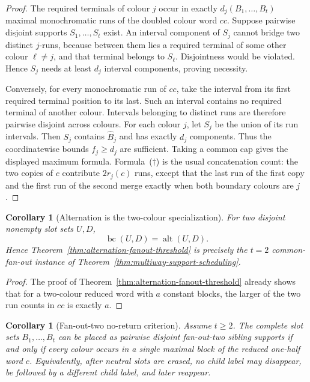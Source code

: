 \documentclass[11pt]{article}
\newtheorem{corollary}[definition]{Corollary}
\begin{document}
\begin{proof}
The required terminals of colour $j$ occur in exactly
$d_j(B_1,\ldots,B_t)$ maximal monochromatic runs of the doubled colour word
$cc$.  Suppose pairwise disjoint supports $S_1,\ldots,S_t$ exist.  An interval
component of $S_j$ cannot bridge two distinct $j$-runs, because between them
lies a required terminal of some other colour $\ell\ne j$, and that terminal
belongs to $S_\ell$.  Disjointness would be violated.  Hence $S_j$ needs at
least $d_j$ interval components, proving necessity.

Conversely, for every monochromatic run of $cc$, take the interval from its
first required terminal position to its last.  Such an interval contains no
required terminal of another colour.  Intervals belonging to distinct runs are
therefore pairwise disjoint across colours.  For each colour $j$, let $S_j$ be
the union of its run intervals.  Then $S_j$ contains $\widehat B_j$ and has
exactly $d_j$ components.  Thus the coordinatewise bounds $f_j\ge d_j$ are
sufficient.  Taking a common cap gives the displayed maximum formula.
Formula~\textup{($\dagger$)} is the usual concatenation count: the two copies of
$c$ contribute $2r_j(c)$ runs, except that the last run of the first copy and
the first run of the second merge exactly when both boundary colours are $j$.
\end{proof}

\begin{corollary}[Alternation is the two-colour specialization]
\label{cor:alternation-is-two-colour}
For two disjoint nonempty slot sets $U,D$,
\[
 \operatorname{bc}(U,D)=\operatorname{alt}(U,D).
\]
Hence Theorem~\ref{thm:alternation-fanout-threshold} is precisely the
$t=2$ common-fan-out instance of
Theorem~\ref{thm:multiway-support-scheduling}.
\end{corollary}

\begin{proof}
The proof of Theorem~\ref{thm:alternation-fanout-threshold} already shows that
for a two-colour reduced word with $a$ constant blocks, the larger of the two
run counts in $cc$ is exactly $a$.
\end{proof}

\begin{corollary}[Fan-out-two no-return criterion]
\label{cor:fanout-two-no-return}
Assume $t\ge2$.  The complete slot sets $B_1,\ldots,B_t$ can be placed as
pairwise disjoint fan-out-two sibling supports if and only if every colour
occurs in a single maximal block of the reduced one-half word $c$.
Equivalently, after neutral slots are erased, no child label may disappear,
be followed by a different child label, and later reappear.
\end{corollary}
\end{document}
